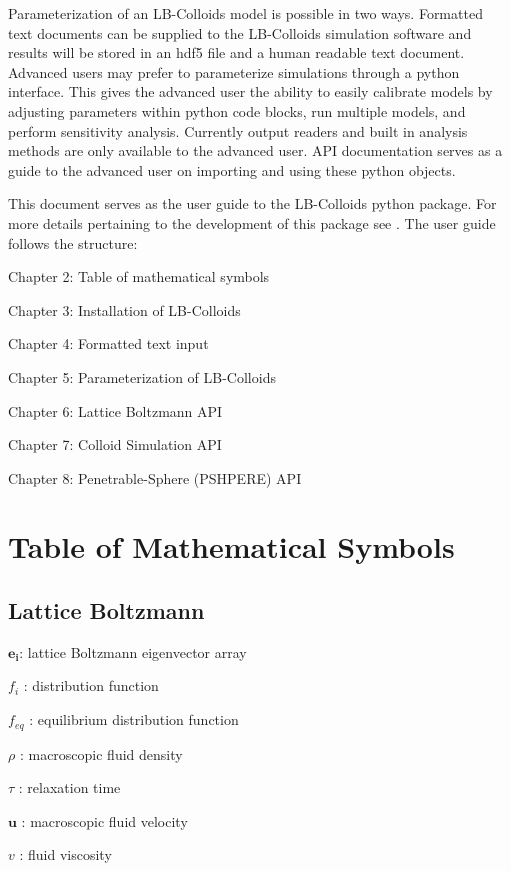 \documentclass[letterpaper,10pt,english]{sphinxmanual}
\begin{document}
Parameterization of an LB-Colloids model is possible in two ways. Formatted text documents can be supplied to the LB-Colloids simulation software and results will be stored in an hdf5 file and a human readable text document. Advanced users may prefer to parameterize simulations through a python interface. This gives the advanced user the ability to easily calibrate models by adjusting parameters within python code blocks, run multiple models, and perform sensitivity analysis. Currently output readers and built in analysis methods are only available to the advanced user. API documentation serves as a guide to the advanced user on importing and using these python objects.

This document serves as the user guide to the LB-Colloids python package. For more details pertaining to the development of this package see . The user guide follows the structure:

Chapter 2: Table of mathematical symbols

Chapter 3: Installation of LB-Colloids

Chapter 4: Formatted text input

Chapter 5: Parameterization of LB-Colloids

Chapter 6: Lattice Boltzmann API

Chapter 7: Colloid Simulation API

Chapter 8: Penetrable-Sphere (PSHPERE) API


\chapter{Table of Mathematical Symbols}
\label{\detokenize{index:table-of-mathematical-symbols}}

\section{Lattice Boltzmann}
\label{\detokenize{index:lattice-boltzmann}}
\(\pmb{e_{i}}\): lattice Boltzmann eigenvector array

\(f_{i}\) :  distribution function

\(f_{eq}\) : equilibrium distribution function

\(\rho\) :  macroscopic fluid density

\(\tau\) :  relaxation time

\(\pmb{u}\) :  macroscopic fluid velocity

\(v\) : fluid viscosity
\end{document}
